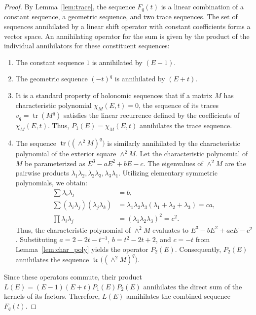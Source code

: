\documentclass[11pt]{article}
\begin{document}
\begin{proof}
By Lemma~\ref{lem:trace}, the sequence $F_q(t)$ is a linear combination of a constant sequence, a geometric sequence, and two trace sequences. The set of sequences annihilated by a linear shift operator with constant coefficients forms a vector space. An annihilating operator for the sum is given by the product of the individual annihilators for these constituent sequences:
\begin{enumerate}
    \item The constant sequence $1$ is annihilated by $(E-1)$.
    \item The geometric sequence $(-t)^q$ is annihilated by $(E+t)$.
    \item It is a standard property of holonomic sequences that if a matrix $M$ has characteristic polynomial $\chi_M(E,t)=0$, the sequence of its traces $v_q = \operatorname{tr}(M^q)$ satisfies the linear recurrence defined by the coefficients of $\chi_M(E,t)$. Thus, $P_1(E) = \chi_M(E,t)$ annihilates the trace sequence.
    \item The sequence $\operatorname{tr}\big((\wedge^2 M)^q\big)$ is similarly annihilated by the characteristic polynomial of the exterior square $\wedge^2 M$. Let the characteristic polynomial of $M$ be parameterized as $E^3 - aE^2 + bE - c$. The eigenvalues of $\wedge^2 M$ are the pairwise products $\lambda_1\lambda_2, \lambda_2\lambda_3, \lambda_3\lambda_1$. Utilizing elementary symmetric polynomials, we obtain:
    \begin{align*}
    \sum \lambda_i\lambda_j &= b, \\
    \sum (\lambda_i\lambda_j)(\lambda_j\lambda_k) &= \lambda_1\lambda_2\lambda_3(\lambda_1+\lambda_2+\lambda_3) = ca, \\
    \prod \lambda_i\lambda_j &= (\lambda_1\lambda_2\lambda_3)^2 = c^2.
    \end{align*}
    Thus, the characteristic polynomial of $\wedge^2 M$ evaluates to $E^3 - bE^2 + acE - c^2$. Substituting $a = 2 - 2t - t^{-1}$, $b = t^2 - 2t + 2$, and $c = -t$ from Lemma~\ref{lem:char_poly} yields the operator $P_2(E)$. Consequently, $P_2(E)$ annihilates the sequence $\operatorname{tr}\big((\wedge^2 M)^q\big)$.
\end{enumerate}
Since these operators commute, their product $L(E) = (E-1)(E+t)P_1(E)P_2(E)$ annihilates the direct sum of the kernels of its factors. Therefore, $L(E)$ annihilates the combined sequence $F_q(t)$.
\end{proof}
\end{document}

